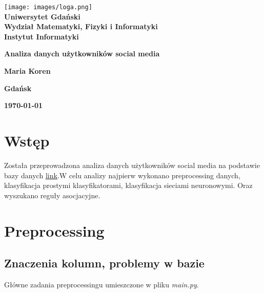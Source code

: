 \documentclass[12pt,a4paper]{article}
\newcommand{\hmwkTitle}{Analiza danych użytkowników social media}
\newcommand{\hmwkDueDate}{\today}
\newcommand{\hmwkAuthorName}{Maria Koren}
\begin{document}
\begin{titlepage}
    \vfill
	\begin{center}
	\hspace*{-1cm}
	\vspace*{0.5cm}
    \texttt{[image: images/loga.png]}\\
	\textbf{Uniwersytet Gdański \\ [0.05cm]Wydział Matematyki, Fizyki i Informatyki \\ [0.05cm] Instytut Informatyki}

	\vspace{0.6cm}
	\vspace{4cm}
	{\huge \textbf{\hmwkTitle}}\vspace{8mm}
	
	{\large \textbf{\hmwkAuthorName}}\\[3cm]
	
		\hspace{.45\textwidth} %
	   \begin{minipage}{.5\textwidth}

	  \end{minipage}
	  \vfill
	
	\textbf{Gdańsk}
	
	\textbf{\hmwkDueDate}
	\end{center}
	
\end{titlepage}

\newpage
\setcounter{secnumdepth}{5}
\tableofcontents
\newpage

\section{Wstęp}

Została przeprowadzona analiza danych użytkowników social media na podstawie bazy danych \href{https://www.kaggle.com/datasets/arindamsahoo/social-media-users/data}{link}.W celu analizy najpierw wykonano preprocessing danych, klasyfikacja prostymi klasyfikatorami, klasyfikacja sieciami neuronowymi. Oraz wyszukano reguły asocjacyjne.

\newpage

\section{Preprocessing}

\subsection{Znaczenia kolumn, problemy w bazie}
Główne zadania preprocessingu umieszczone w pliku \textit{main.py}. 
\end{document}
